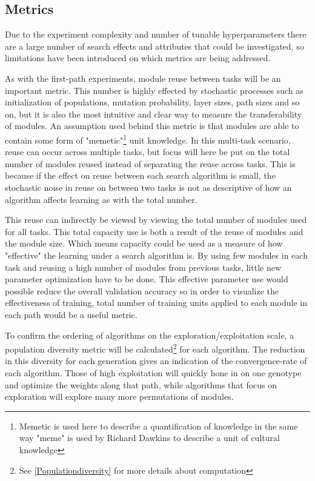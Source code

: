 \subsection{Metrics}\label{Search-experiment:Metrics}
Due to the experiment complexity and number of tunable hyperparameters there are a large number of search effects and attributes that could be investigated, so limitations have been introduced on which metrics are being addressed. 

As with the first-path experiments, module reuse between tasks will be an important metric. This number is highly effected by stochastic processes such as initialization of populations, mutation probability, layer sizes, path sizes and so on, but it is also the most intuitive and clear way to measure the transferability of modules. An assumption used behind this metric is that modules are able to contain some form of "memetic"\footnote{Memetic is used here to describe a quantification of knowledge in the same way "meme" is used by Richard Dawkins\cite{selfishGene} to describe a unit of cultural knowledge} unit knowledge. In this multi-task scenario, reuse can occur across multiple tasks, but focus will here be put on the total number of modules reused instead of separating the reuse across tasks. This is because if the effect on reuse between each search algorithm is small, the stochastic noise in reuse on between two tasks is not as descriptive of how an algorithm affects learning as with the total number. 

This reuse can indirectly be viewed by viewing the total number of modules used for all tasks. This total capacity use is both a result of the reuse of modules and the module size. Which means capacity could be used as a measure of how "effective" the learning under a search algorithm is. By using few modules in each task and reusing a high number of modules from previous tasks, little new parameter optimization have to be done. This effective parameter use would possible reduce the overall validation accuracy so in order to visualize the effectiveness of training, total number of training units applied to each module in each path would be a useful metric. 

To confirm the ordering of algorithms on the exploration/exploitation scale, a population diversity metric will be calculated\footnote{See \ref{Populationdiversity} for more details about computation} for each algorithm. The reduction in this diversity for each generation gives an indication of the convergence-rate of each algorithm. Those of high exploitation will quickly hone in on one genotype and optimize the weights along that path, while algorithms that focus on exploration will explore many more permutations of modules. 

